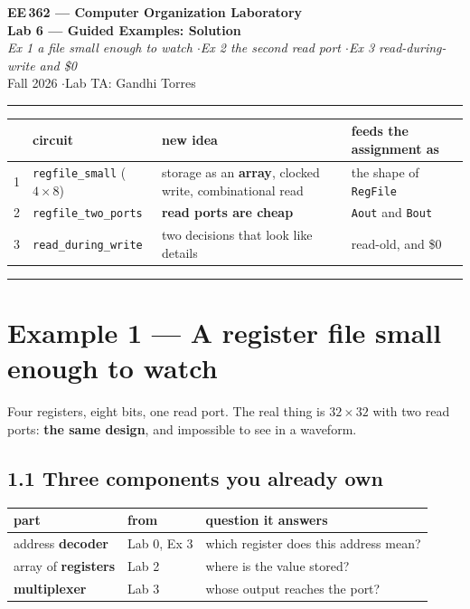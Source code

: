 \documentclass[11pt]{article}
\newcommand{\code}[1]{\texttt{#1}}
\newcommand{\hr}{\vspace{2pt}\hrule\vspace{6pt}}
\begin{document}
\begin{center}
{\Large\bfseries EE\,362 --- Computer Organization Laboratory}\\[2pt]
{\large\bfseries Lab 6 --- Guided Examples: Solution}\\[2pt]
{\itshape Ex 1 a file small enough to watch \quad$\cdot$\quad Ex 2 the second read port \quad$\cdot$\quad Ex 3 read-during-write and \$0}\\[4pt]
Fall 2026 \quad$\cdot$\quad Lab TA: Gandhi Torres
\end{center}
\hr

\begin{center}
\small
\begin{tabular}{cl>{\raggedright\arraybackslash}p{6.2cm}>{\raggedright\arraybackslash}p{3.6cm}}
\toprule
& circuit & new idea & feeds the assignment as \\
\midrule
1 & \code{regfile\_small} ($4 \times 8$) & storage as an \textbf{array}, clocked write, combinational read & the shape of \code{RegFile} \\
2 & \code{regfile\_two\_ports} & \textbf{read ports are cheap} & \code{Aout} and \code{Bout} \\
3 & \code{read\_during\_write} & two decisions that look like details & read-old, and \$0 \\
\bottomrule
\end{tabular}
\end{center}

\vspace{4pt}\hr

\section*{Example 1 --- A register file small enough to watch}

Four registers, eight bits, one read port. The real thing is $32 \times 32$ with
two read ports: \textbf{the same design}, and impossible to see in a waveform.

\subsection*{1.1 Three components you already own}

\begin{center}
\begin{tabular}{lll}
\toprule
part & from & question it answers \\
\midrule
address \textbf{decoder} & Lab 0, Ex 3 & which register does this address mean? \\
array of \textbf{registers} & Lab 2 & where is the value stored? \\
\textbf{multiplexer} & Lab 3 & whose output reaches the port? \\
\bottomrule
\end{tabular}
\end{center}
\end{document}
